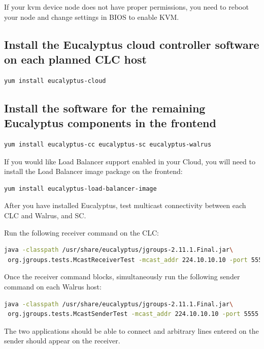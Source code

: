 If your kvm device node does not have proper permissions, you need to reboot your node and change settings in BIOS to enable KVM.
\\ \linebreak
\subsection{Install the Eucalyptus cloud controller software on each planned CLC host}
\begin{lstlisting}[language=bash]
yum install eucalyptus-cloud
\end{lstlisting}
\subsection{Install the software for the remaining Eucalyptus components in the frontend}
\begin{lstlisting}[language=bash]
yum install eucalyptus-cc eucalyptus-sc eucalyptus-walrus
\end{lstlisting}
If you would like Load Balancer support enabled in your Cloud, you will need to install the Load Balancer image package on the frontend:
\begin{lstlisting}[language=bash]
yum install eucalyptus-load-balancer-image
\end{lstlisting}

After you have installed Eucalyptus, test multicast connectivity between each CLC and Walrus, and SC.
\\ \linebreak

Run the following receiver command on the CLC:
\begin{lstlisting}[language=bash]
java -classpath /usr/share/eucalyptus/jgroups-2.11.1.Final.jar\
 org.jgroups.tests.McastReceiverTest -mcast_addr 224.10.10.10 -port 5555
\end{lstlisting}

Once the receiver command blocks, simultaneously run the following sender command on each Walrus host:
\begin{lstlisting}[language=bash]
java -classpath /usr/share/eucalyptus/jgroups-2.11.1.Final.jar\
 org.jgroups.tests.McastSenderTest -mcast_addr 224.10.10.10 -port 5555
\end{lstlisting}

The two applications should be able to connect and arbitrary lines entered on the sender should appear on the receiver.

